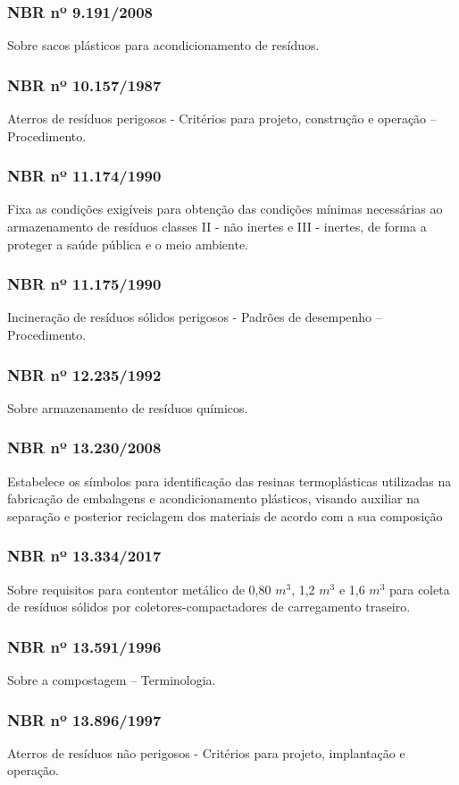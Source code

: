 \begin{subapend}
\begin{subsubapend}
		\subsubsection{NBR nº 9.191/2008}
		Sobre sacos plásticos para acondicionamento de resíduos.
		\subsubsection{NBR nº 10.157/1987}
		Aterros de resíduos perigosos - Critérios para projeto, construção e operação – Procedimento.
		\subsubsection{NBR nº 11.174/1990}
		Fixa as condições exigíveis para obtenção das condições mínimas necessárias ao armazenamento de resíduos classes II - não inertes e III - inertes, de forma a proteger a saúde pública e o meio ambiente.
		\subsubsection{NBR nº 11.175/1990}
		Incineração de resíduos sólidos perigosos - Padrões de desempenho – Procedimento.
		\subsubsection{NBR nº 12.235/1992}
		Sobre armazenamento de resíduos químicos.
		\subsubsection{NBR nº 13.230/2008}
		Estabelece os símbolos para identificação das resinas termoplásticas utilizadas na fabricação de embalagens e acondicionamento plásticos, visando auxiliar na separação e posterior reciclagem dos materiais de acordo com a sua composição
		\subsubsection{NBR nº 13.334/2017}
		Sobre requisitos para contentor metálico de 0,80 $m^3$, 1,2 $m^3$ e 1,6 $m^3$ para coleta de resíduos sólidos por coletores-compactadores de carregamento traseiro.
		\subsubsection{NBR nº 13.591/1996}
		Sobre a compostagem – Terminologia.
		\subsubsection{NBR nº 13.896/1997}
		Aterros de resíduos não perigosos - Critérios para projeto, implantação e operação.

\end{subsubapend}
\end{subapend}
